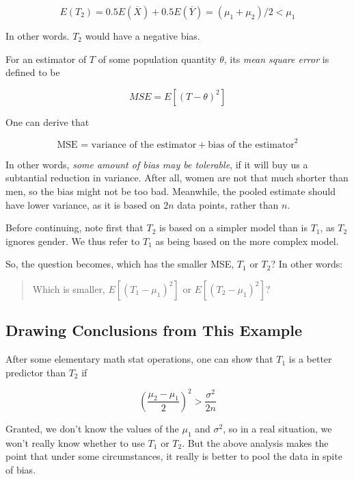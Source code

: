 \begin{equation}
E(T_2) = 0.5 E(\overline{X}) + 0.5 E(\overline{Y}) = (\mu_1 + \mu_2) / 2
< \mu_1
\end{equation}

In other words.  $T_2$ would have a negative bias.  

For an estimator of $T$ of some population quantity $\theta$, its
\textit{mean square error} is defined to be

\begin{equation}
MSE = E[(T - \theta)^2] 
\end{equation}

One can derive that 

\begin{equation}
\textrm{MSE = variance of the estimator} + \textrm{bias of the
estimator} ^2
\end{equation}

In other words, {\it some amount of bias may be tolerable}, if it will
buy us a subtantial reduction in variance.  After all, women are not
that much shorter than men, so the bias might not be too bad.
Meanwhile, the pooled estimate should have lower variance, as it is
based on $2n$ data points, rather than $n$.

Before continuing, note first that $T_2$ is based on a simpler model
than is $T_1$, as $T_2$ ignores gender.  We thus refer to $T_1$ as being
based on the more complex model.

So, the question becomes, which has the smaller MSE, $T_1$ or
$T_2$?  In other words:

\begin{quote}
Which is smaller, $E[(T_1 - \mu_1)^2]$ or $E[(T_2 - \mu_1)^2]$?
\end{quote}

\subsection{Drawing Conclusions from This Example}

After some elementary math stat operations, one can show that
$T_1$ is a better predictor than $T_2$ if 

\begin{equation}
\label{betteriff}
\left ( \frac{\mu_2-\mu_1}{2} \right)^2 >
\frac{\sigma^2}{2n}
\end{equation}

Granted, we don't know the values of the $\mu_1$ and $\sigma^2$, so in a
real situation, we won't really know whether to use $T_1$ or $T_2$.  But
the above analysis makes the point that under some circumstances, it
really is better to pool the data in spite of bias.

